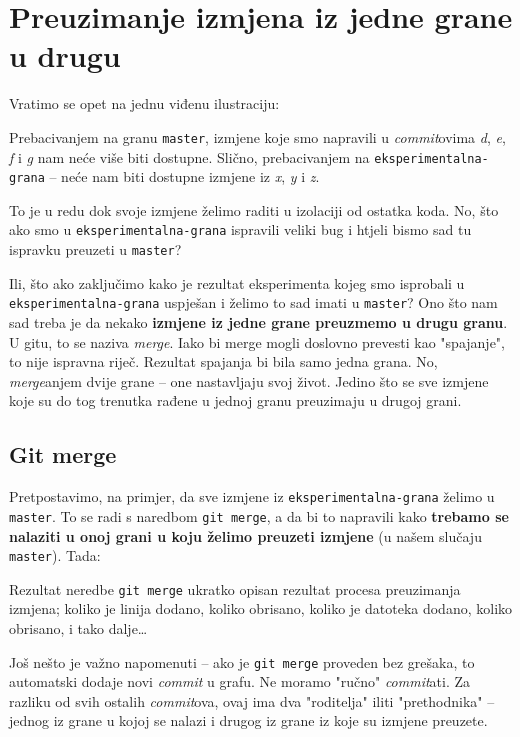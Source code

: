\chapter*{Preuzimanje izmjena iz jedne grane u drugu}

Vratimo se opet na jednu viđenu ilustraciju:



Prebacivanjem na granu \verb+master+, izmjene koje smo napravili u \emph{commit}ovima \emph d, \emph e, \emph f i \emph g nam neće više biti dostupne.
Slično, prebacivanjem na \verb+eksperimentalna-grana+ -- neće nam biti dostupne izmjene iz \emph x, \emph y i \emph z.

To je u redu dok svoje izmjene želimo raditi u izolaciji od ostatka koda. 
No, što ako smo u \verb+eksperimentalna-grana+ ispravili veliki bug i htjeli bismo sad tu ispravku preuzeti u \verb+master+?

Ili, što ako zaključimo kako je rezultat eksperimenta kojeg smo isprobali u \\
\verb+eksperimentalna-grana+ uspješan i želimo to sad imati u \verb+master+?
Ono što nam sad treba je da nekako \textbf{izmjene iz jedne grane preuzmemo u drugu granu}.
U gitu, to se naziva \emph{merge}.
Iako bi merge mogli doslovno prevesti kao "spajanje", to nije ispravna riječ. 
Rezultat spajanja bi bila samo jedna grana. 
No, \emph{merge}anjem dvije grane -- one nastavljaju svoj život. 
Jedino što se sve izmjene koje su do tog trenutka rađene u jednoj granu preuzimaju u drugoj grani.

\section*{Git merge}

Pretpostavimo, na primjer, da sve izmjene iz \verb+eksperimentalna-grana+ želimo u \verb+master+. 
To se radi s naredbom \verb+git merge+, a da bi to napravili kako \textbf{trebamo se nalaziti u onoj grani u koju želimo preuzeti izmjene} (u našem slučaju \verb+master+).
Tada:



Rezultat neredbe \verb+git merge+ ukratko opisan rezultat procesa preuzimanja izmjena; koliko je linija dodano, koliko obrisano, koliko je datoteka dodano, koliko obrisano, i tako dalje\dots

Još nešto je važno napomenuti -- ako je \verb+git merge+ proveden bez grešaka, to automatski dodaje novi \emph{commit} u grafu. 
Ne moramo "ručno" \emph{commit}ati.
Za razliku od svih ostalih \emph{commit}ova, ovaj ima dva "roditelja" iliti "prethodnika" -- jednog iz grane u kojoj se nalazi i drugog iz grane iz koje su izmjene preuzete.

